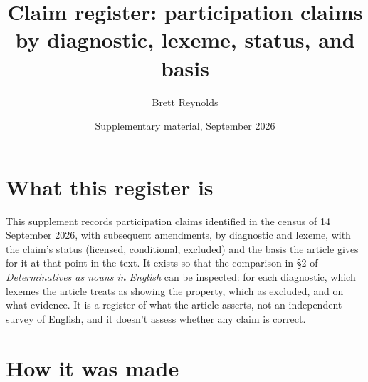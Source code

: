 \documentclass[12pt]{article}
\title{Claim register: participation claims by diagnostic, lexeme, status, and basis}
\author{Brett Reynolds}
\date{Supplementary material, September 2026}
\begin{document}
\maketitle

\section{What this register is}

This supplement records participation claims identified in the census of 14 September 2026, with subsequent amendments, by diagnostic and lexeme, with the claim's status (licensed, conditional, excluded) and the basis the article gives for it at that point in the text. It exists so that the comparison in §2 of \textit{Determinatives as nouns in English} can be inspected: for each diagnostic, which lexemes the article treats as showing the property, which as excluded, and on what evidence. It is a register of what the article asserts, not an independent survey of English, and it doesn't assess whether any claim is correct.

\section{How it was made}
\end{document}
